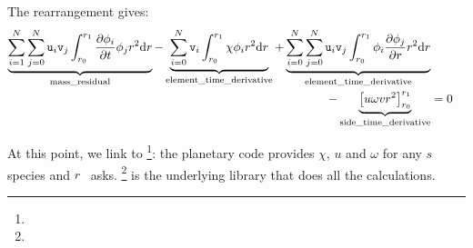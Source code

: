 The rearrangement gives:
\begin{equation}
\begin{split}
  \underbrace{\sum_{i=1}^{N}\sum_{j=0}^{N}\mathtt{u}_i\mathtt{v}_j\int_{r_0}^{r_1}\frac{\partial\phi_i}{\partial t}\phi_jr^2\mathrm{d} r}_\text{mass\_residual}      
- \underbrace{\sum_{i=0}^{N}\mathtt{v}_i\int_{r_0}^{r_1}\chi\phi_i r^2\mathrm{d} r}_\text{element\_time\_derivative}                           
+ \underbrace{\sum_{i=0}^{N}\sum_{j=0}^{N}\mathtt{u}_i\mathtt{v}_j\int_{r_0}^{r_1}\phi_i\frac{\partial\phi_j}{\partial r}r^2\mathrm{d} r}_\text{element\_time\_derivative}       \\
 - \underbrace{\left[u\omega v r^2\right]_{r_0}^{r_1}}_\text{side\_time\_derivative}  & = 0
\end{split}
\end{equation}


At this point, we link to \GRINS\footnote{\GitGrins}: the planetary code provides $\chi$, $u$ and
$\omega$ for any $s$ species and $r$ \GRINS\ asks. \LibMesh\footnote{\GitLibmesh} is the underlying library that
does all the calculations.
